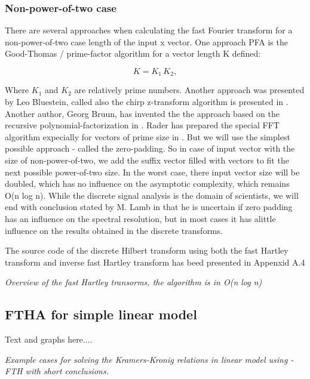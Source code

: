 \documentclass[12pt,twoside,a4paper]{article}
\numberwithin{equation}{subsection}
\numberwithin{figure}{subsection}
\begin{document}
\subsubsection*{Non-power-of-two case}

There are several approaches when calculating the fast Fourier transform for a non-power-of-two case length of the input x vector. 
One approach PFA is the Good-Thomas \cite{Good_interaction} / prime-factor algorithm for a vector length K defined:

\begin{equation}  \label{eq:hartley_goodk}
  K={K_{1}}\,{K_{2}},
\end{equation}

Where ${K_{1}}$ and ${K_{2}}$ are relatively prime numbers. Another approach was presented by Leo Bluestein, called also the chirp
z-transform algorithm is presented in \cite{bluestein_linear}. Another author, Georg Bruun, has invented the the approach based on
the recursive polynomial-factorization in \cite{bruun_ztransform}. Rader has prepared the special FFT algorithm expecially for
vectors of prime size in \cite{rader_dicrete}. But we will use the simplest possible approach - called the zero-padding. So in case
of input vector with the size of non-power-of-two, we add the suffix vector filled with vectors to fit the next possible
power-of-two size. In the worst case, there input vector size will be doubled, which has no influence on the asymptotic complexity,
which remains O(n log n). While the discrete signal analysis is the domain of scientists, we will end with conclusion stated by M.
Lamb in \cite{lamb_issues} that he is uncertain if zero padding has an influence on the spectral resolution, but in most cases it
has alittle influence on the results obtained in the discrete transforms.

The source code of the discrete Hilbert transform using both the fast Hartley transform and inverse fast Hartley transform has beed
presented in Appenxid A.4

\textit{Overview of the fast Hartley transorms, the algorithm is in O(n log n)}

\subsection{FTHA for simple linear model} \label{chap:hartley_lin}

Text and graphs here.... 

\textit{Example cases for solving the Kramers-Kronig relations in linear model using  - FTH with short conclusions.}
\end{document}
